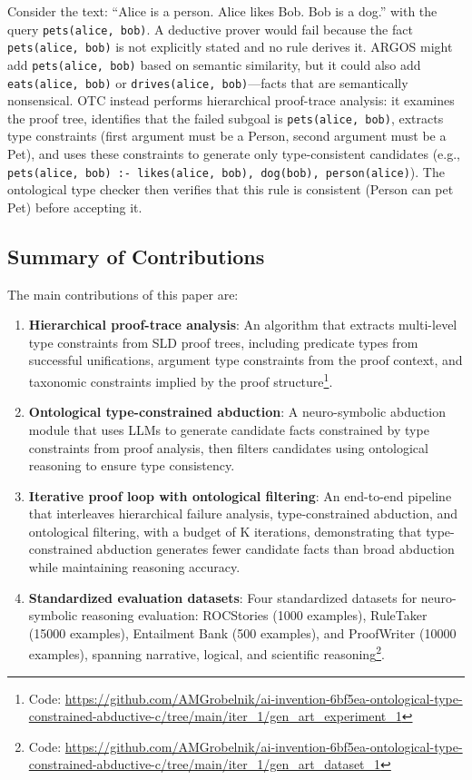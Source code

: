 \documentclass[11pt,letterpaper]{article}
\begin{document}
Consider the text: ``Alice is a person. Alice likes Bob. Bob is a dog.'' with the query \texttt{pets(alice, bob)}. A deductive prover would fail because the fact \texttt{pets(alice, bob)} is not explicitly stated and no rule derives it. ARGOS might add \texttt{pets(alice, bob)} based on semantic similarity, but it could also add \texttt{eats(alice, bob)} or \texttt{drives(alice, bob)}---facts that are semantically nonsensical. OTC instead performs hierarchical proof-trace analysis: it examines the proof tree, identifies that the failed subgoal is \texttt{pets(alice, bob)}, extracts type constraints (first argument must be a Person, second argument must be a Pet), and uses these constraints to generate only type-consistent candidates (e.g., \texttt{pets(alice, bob) :- likes(alice, bob), dog(bob), person(alice)}). The ontological type checker then verifies that this rule is consistent (Person can pet Pet) before accepting it.

\subsection{Summary of Contributions}

The main contributions of this paper are:

\begin{enumerate}
  \item \textbf{Hierarchical proof-trace analysis}: An algorithm that extracts multi-level type constraints from SLD proof trees, including predicate types from successful unifications, argument type constraints from the proof context, and taxonomic constraints implied by the proof structure\footnote{Code: \url{https://github.com/AMGrobelnik/ai-invention-6bf5ea-ontological-type-constrained-abductive-c/tree/main/iter_1/gen_art_experiment_1}}.

  \item \textbf{Ontological type-constrained abduction}: A neuro-symbolic abduction module that uses LLMs to generate candidate facts constrained by type constraints from proof analysis, then filters candidates using ontological reasoning to ensure type consistency.

  \item \textbf{Iterative proof loop with ontological filtering}: An end-to-end pipeline that interleaves hierarchical failure analysis, type-constrained abduction, and ontological filtering, with a budget of K iterations, demonstrating that type-constrained abduction generates fewer candidate facts than broad abduction while maintaining reasoning accuracy.

  \item \textbf{Standardized evaluation datasets}: Four standardized datasets for neuro-symbolic reasoning evaluation: ROCStories (1000 examples), RuleTaker (15000 examples), Entailment Bank (500 examples), and ProofWriter (10000 examples), spanning narrative, logical, and scientific reasoning\footnote{Code: \url{https://github.com/AMGrobelnik/ai-invention-6bf5ea-ontological-type-constrained-abductive-c/tree/main/iter_1/gen_art_dataset_1}}.
\end{enumerate}
\end{document}
